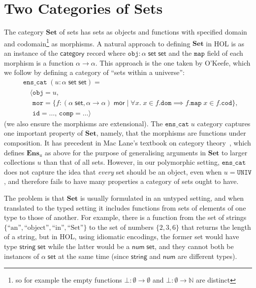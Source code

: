 \documentclass[twoside,titlepage,11pt]{article}
\begin{document}
\section{Two Categories of Sets}%
\label{Set}
\newcommand{\Set}{\ensuremath{\mathbf{Set}}}
The category $\Set$ of sets has sets as objects and functions with specified domain and codomain\footnote{so for example the empty functions $\bot:\emptyset\to\emptyset$ and $\bot:\emptyset\to\mathbb{N}$ are distinct} as morphisms.
A natural approach to defining $\Set$ in HOL is as an instance of the $\mathsf{category}$ record where $\mathtt{obj}:\alpha\;\mathsf{set}\;\mathsf{set}$ and the $\mathtt{map}$ field of each morphism is a function $\alpha\to\alpha$.
This approach is the one taken by O'Keefe, which we follow by defining a category of ``sets within a universe'':
\begin{align*}
&\mathtt{ens\_cat}\;(u:\alpha\;\mathsf{set}\;\mathsf{set})=\\
&\quad\langle\mathtt{obj}=u,\\
&\quad\phantom{\langle}\mathtt{mor}=\{f:(\alpha\;\mathsf{set},\alpha\to\alpha)\;\mathsf{mor}\mid \forall{x}.\;x\in f.\mathtt{dom}\implies f.\mathtt{map}\;x\in f.\mathtt{cod}\},\\
&\quad\phantom{\langle}\mathtt{id}=\dots,\,\mathtt{comp}=\dots\rangle
\end{align*}
(we also ensure the morphisms are extensional).
The $\mathtt{ens\_cat}\;u$ category captures one important property of $\Set$, namely, that the morphisms are functions under composition.
It has precedent in Mac Lane's textbook on category theory~\cite{MacLaneCFTWM}, which defines $\mathbf{Ens}_u$ as above for the purpose of generalising arguments in $\Set$ to larger collections $u$ than that of all sets.
However, in our polymorphic setting, $\mathtt{ens\_cat}$ does not capture the idea that \emph{every} set should be an object, even when $u=\mathtt{UNIV}$, and therefore fails to have many properties a category of sets ought to have.

The problem is that $\Set$ is usually formulated in an untyped setting, and when translated to the typed setting it includes functions from sets of elements of one type to those of another.
For example, there is a function from the set of strings $\{\text{``an''},\text{``object''},\text{``in''},\text{``Set''}\}$ to the set of numbers $\{2,3,6\}$ that returns the length of a string, but in HOL, using idiomatic encodings, the former set would have type $\mathsf{string}\;\mathsf{set}$ while the latter would be a $\mathsf{num}\;\mathsf{set}$, and they cannot both be instances of $\alpha\;\mathsf{set}$ at the same time (since $\mathsf{string}$ and $\mathsf{num}$ are different types).
\end{document}
